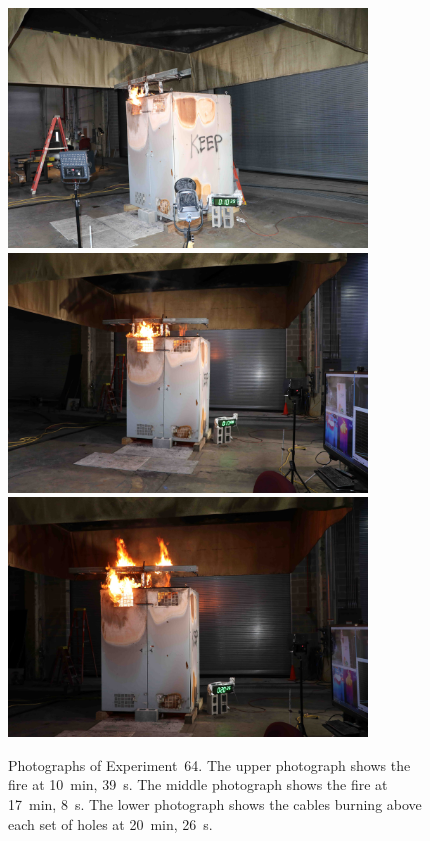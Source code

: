 \begin{figure}[p]
\centering
\includegraphics[height=2.50in]{../FIGURES/Test_64_10_min_39_s} \\ \vspace{0.1in}
\includegraphics[height=2.50in]{../FIGURES/Test_64_17_min_8_s} \\ \vspace{0.1in}
\includegraphics[height=2.50in]{../FIGURES/Test_64_20_min_26_s}
\caption[Photographs of Experiment~64]{Photographs of Experiment~64. The upper photograph shows the fire at 10~min, 39~s. The middle photograph shows the fire at 17~min, 8~s. The lower photograph shows the cables burning above each set of holes at 20~min, 26~s.}
\label{fig:Test_64_photos}
\end{figure}


